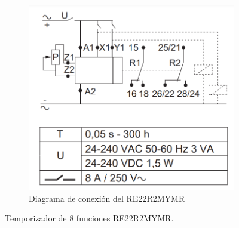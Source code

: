 \begin{figure}
\begin{subfigure}[b]{0.5\textwidth}
		\centering
		\includegraphics[width=\textwidth]{Imagenes/TimerDiagram}
		\caption{Diagrama de conexión del RE22R2MYMR \cite{Scheneider4} }
		\label{fig:Diagrama}
	\end{subfigure}
	\caption{Temporizador de 8 funciones RE22R2MYMR.}
\end{figure}



